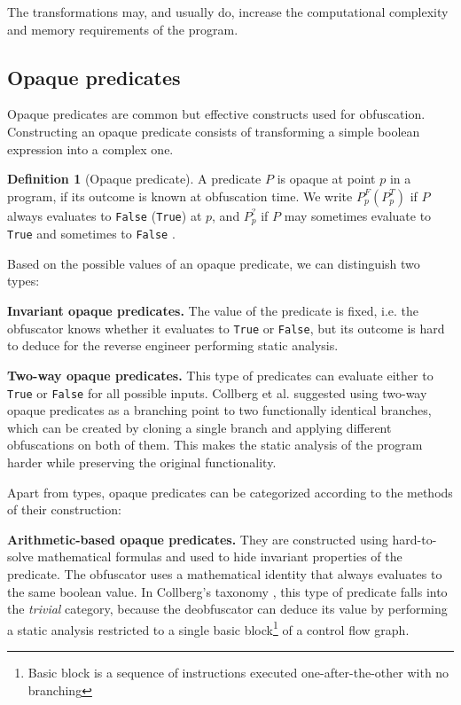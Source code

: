 \documentclass[
  digital, %
  notable,   %
  twoside, %
  nolof,     %
  nolot,     %
]{fithesis3}
\theoremstyle{definition}
\newtheorem{definition}{Definition}[section]
\begin{document}
The transformations may, and usually do, increase the computational complexity and memory requirements of the program. 

\subsection{Opaque predicates} \label{opaque}
Opaque predicates are common but effective constructs used for obfuscation. Constructing an opaque predicate consists of transforming a simple boolean expression into a complex one. 

\begin{definition}[Opaque predicate]
\label{def:opaque}
A predicate $P$ is opaque at point $p$ in a program, if its outcome is known at obfuscation time. We write $P_p^F (P_p^T)$ if $P$ always evaluates to \texttt{False} (\texttt{True}) at $p$, and $P_p^?$ if $P$ may sometimes evaluate to \texttt{True} and sometimes to \texttt{False} \cite{manufacturing_opaque}.
\end{definition}

Based on the possible values of an opaque predicate, we can distinguish two types:

\textbf{Invariant opaque predicates.} The value of the predicate is fixed, i.e. the obfuscator knows whether it evaluates to \texttt{True} or \texttt{False}, but its outcome is hard to deduce for the reverse engineer performing static analysis. 

\textbf{Two-way opaque predicates.} This type of predicates can evaluate either to \texttt{True} or \texttt{False} for all possible inputs. Collberg et al. \cite{taxonomy_obf} suggested using two-way opaque predicates as a branching point to two functionally identical branches, which can be created by cloning a single branch and applying different obfuscations on both of them. This makes the static analysis of the program harder while preserving the original functionality. 

Apart from types, opaque predicates can be categorized according to the methods of their construction: 

\textbf{Arithmetic-based opaque predicates.} They are constructed using hard-to-solve mathematical formulas and used to hide invariant properties of the predicate. The obfuscator uses a mathematical identity that always evaluates to the same boolean value. In Collberg's taxonomy \cite{taxonomy_obf}, this type of predicate falls into the \textit{trivial} category, because the deobfuscator can deduce its value by performing a static analysis restricted to a single basic block\footnote{Basic block is a sequence of instructions executed one-after-the-other with no branching\cite{dragonBook}} of a control flow graph. 
\end{document}
